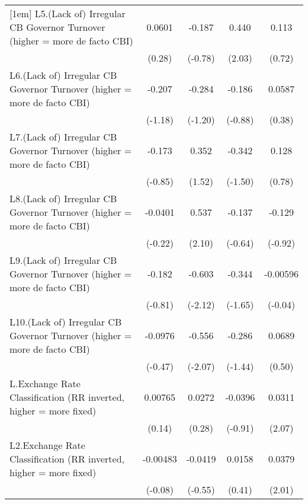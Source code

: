 {\begin{longtable}{l*{4}{c}}
[1em]
L5.(Lack of) Irregular CB Governor Turnover (higher = more de facto CBI)&   0.0601         &   -0.187         &    0.440\sym{*}  &    0.113         \\
                &   (0.28)         &  (-0.78)         &   (2.03)         &   (0.72)         \\
[1em]
L6.(Lack of) Irregular CB Governor Turnover (higher = more de facto CBI)&   -0.207         &   -0.284         &   -0.186         &   0.0587         \\
                &  (-1.18)         &  (-1.20)         &  (-0.88)         &   (0.38)         \\
[1em]
L7.(Lack of) Irregular CB Governor Turnover (higher = more de facto CBI)&   -0.173         &    0.352         &   -0.342         &    0.128         \\
                &  (-0.85)         &   (1.52)         &  (-1.50)         &   (0.78)         \\
[1em]
L8.(Lack of) Irregular CB Governor Turnover (higher = more de facto CBI)&  -0.0401         &    0.537\sym{*}  &   -0.137         &   -0.129         \\
                &  (-0.22)         &   (2.10)         &  (-0.64)         &  (-0.92)         \\
[1em]
L9.(Lack of) Irregular CB Governor Turnover (higher = more de facto CBI)&   -0.182         &   -0.603\sym{*}  &   -0.344         & -0.00596         \\
                &  (-0.81)         &  (-2.12)         &  (-1.65)         &  (-0.04)         \\
[1em]
L10.(Lack of) Irregular CB Governor Turnover (higher = more de facto CBI)&  -0.0976         &   -0.556\sym{*}  &   -0.286         &   0.0689         \\
                &  (-0.47)         &  (-2.07)         &  (-1.44)         &   (0.50)         \\
[1em]
L.Exchange Rate Classification (RR inverted, higher = more fixed)&  0.00765         &   0.0272         &  -0.0396         &   0.0311\sym{*}  \\
                &   (0.14)         &   (0.28)         &  (-0.91)         &   (2.07)         \\
[1em]
L2.Exchange Rate Classification (RR inverted, higher = more fixed)& -0.00483         &  -0.0419         &   0.0158         &   0.0379\sym{*}  \\
                &  (-0.08)         &  (-0.55)         &   (0.41)         &   (2.01)         \\

\end{longtable}}
